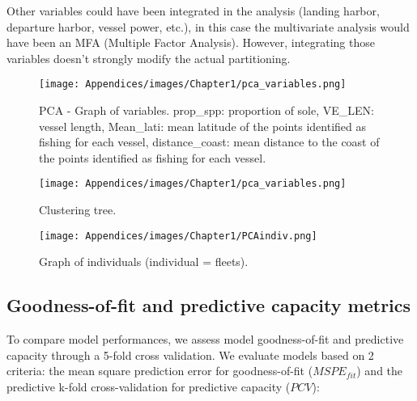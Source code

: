 Other variables could have been integrated in the analysis (landing harbor, departure harbor, vessel power, etc.), in this case the multivariate analysis would have been an MFA (Multiple Factor Analysis). However, integrating those variables doesn’t strongly modify the actual partitioning.

\newpage

\begin{figure}[H]
   \begin{center}
      \texttt{[image: Appendices/images/Chapter1/pca\_variables.png]}
   \end{center}
   \caption[PCA - Graph of variables.]
   {PCA - Graph of variables. prop_spp: proportion of sole, VE_LEN: vessel length, Mean_lati: mean latitude of the points identified as fishing for each vessel, distance_coast: mean distance to the coast of the points identified as fishing for each vessel.}
   \label{fig:PCAVar}
\end{figure}

\begin{figure}[H]
   \begin{center}
      \texttt{[image: Appendices/images/Chapter1/pca\_variables.png]}
   \end{center}
   \caption[Clustering tree.]
   {Clustering tree.}
   \label{fig:HCPCTree}
\end{figure}

\begin{figure}[H]
   \begin{center}
      \texttt{[image: Appendices/images/Chapter1/PCAindiv.png]}
   \end{center}
   \caption[Graph of individuals (individual = fleets).]
   {Graph of individuals (individual = fleets).}
   \label{fig:PCAIndiv}
\end{figure}

\clearpage

\subsection{Goodness-of-fit and predictive capacity metrics}\label{appendix:GOFmetric}

To compare model performances, we assess model goodness-of-fit and predictive capacity through a 5-fold cross validation. We evaluate models based on 2 criteria: the mean square prediction error for goodness-of-fit (\(MSPE_{fit}\)) and the predictive k-fold cross-validation for predictive capacity (\(PCV\)):

